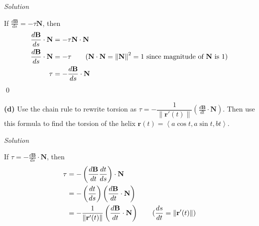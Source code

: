 \documentclass{article}
\newcommand{\lrp}[1]{\left( #1 \right)}
\newcommand{\lra}[1]{\left\langle #1 \right\rangle}
\newcommand{\norm}[1]{\left\lVert #1 \right\rVert}
\newcommand{\N}[0]{\mathbf{N}}
\newcommand{\B}[0]{\mathbf{B}}
\renewcommand{\r}[0]{\mathbf{r}}
\newcommand{\Solution}{\textit{Solution}}
\begin{document}
\Solution

If $\displaystyle \frac{d\B}{ds}=-\tau\N$, then
\begin{align*}
    \frac{d\B}{ds}\cdot \N &= -\tau\N\cdot \N \\
    \frac{d\B}{ds}\cdot \N &= -\tau \tag{$\N \cdot \N=\norm{\N}^2=1$ since magnitude of $\N$ is $1$}\\
    \tau &= -\frac{d\B}{ds}\cdot \N 
\end{align*}
\qed

{}\textbf{(d)} Use the chain rule to rewrite torsion as $\tau = -\dfrac{1}{\norm{\r'(t)}}\lrp{\frac{d\B}{dt}\cdot\N}$. Then use this formula to find the torsion of the helix $\r(t)=\lra{a\cos t, a\sin t, bt}$.

\Solution

If $\displaystyle \tau=-\frac{d\B}{ds}\cdot\N$, then
\begin{align*}
    \tau &= -\lrp{\frac{d\B}{dt} \frac{dt}{ds}}\cdot\N\\
    &=-\lrp{\frac{dt}{ds}}\lrp{\frac{d\B}{dt}\cdot \N}\\
    &=-\frac{1}{\norm{\r'(t)}}\lrp{\frac{d\B}{dt}\cdot \N}\tag{$\displaystyle \frac{ds}{dt}=\norm{\r'(t)}$}
\end{align*}
\end{document}
